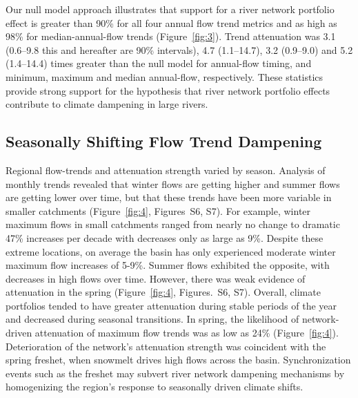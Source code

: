 \documentclass[draft,linenumbers]{AGUJournal}
\begin{document}
Our null model approach illustrates that support for a river network portfolio effect is greater than 90\% for all four annual flow trend metrics and as high as 98\% for median-annual-flow trends (Figure~\ref{fig:3}). Trend attenuation was 3.1 (0.6--9.8 this and hereafter are 90\% intervals), 4.7 (1.1--14.7), 3.2 (0.9--9.0) and 5.2 (1.4--14.4) times greater than the null model for annual-flow timing, and minimum, maximum and median annual-flow, respectively. These statistics provide strong support for the hypothesis that river network portfolio effects contribute to climate dampening in large rivers.

\subsection{Seasonally Shifting Flow Trend Dampening}

Regional flow-trends and attenuation strength varied by season. Analysis of monthly trends revealed that winter flows are getting higher and summer flows are getting lower over time, but that these trends have been more variable in smaller catchments (Figure~\ref{fig:4}, Figures~S6, S7). For example, winter maximum flows in small catchments ranged from nearly no change to dramatic 47\% increases per decade with decreases only as large as 9\%. Despite these extreme locations, on average the basin has only experienced moderate winter maximum flow increases of 5-9\%. Summer flows exhibited the opposite, with decreases in high flows over time. However, there was weak evidence of attenuation in the spring (Figure~\ref{fig:4}, Figures.~S6, S7). Overall, climate portfolios tended to have greater attenuation during stable periods of the year and decreased during seasonal transitions. In spring, the likelihood of network-driven attenuation of maximum flow trends was as low as 24\% (Figure~\ref{fig:4}). Deterioration of the network's attenuation strength was coincident with the spring freshet, when snowmelt drives high flows across the basin. Synchronization events such as the freshet may subvert river network dampening mechanisms by homogenizing the region's response to seasonally driven climate shifts.
 
\end{document}

